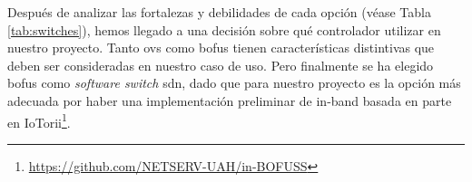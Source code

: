 

Después de analizar las fortalezas y debilidades de cada opción (véase Tabla \ref{tab:switches}), hemos llegado a una decisión sobre qué controlador utilizar en nuestro proyecto. Tanto \gls{ovs} como \gls{bofus} tienen características distintivas que deben ser consideradas en nuestro caso de uso. Pero finalmente se ha elegido \gls{bofus} como \textit{software switch} \gls{sdn}, dado que para nuestro proyecto es la opción más adecuada por haber una implementación preliminar de in-band basada en parte en IoTorii\footnote{\url{https://github.com/NETSERV-UAH/in-BOFUSS}}.